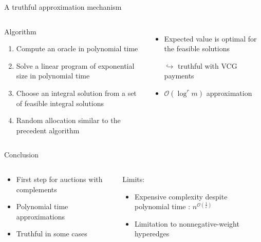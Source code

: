 \documentclass[aspectratio=169]{beamer}
\begin{document}
\begin{frame}{A truthful approximation mechanism}
    \begin{columns}
        \begin{block}{Algorithm}
            \begin{enumerate}
                \item Compute an oracle in polynomial time
                \item Solve a linear program of exponential size in polynomial time
                \item Choose an integral solution from a set of feasible integral solutions
                \item Random allocation similar to the precedent algorithm
            \end{enumerate}
        \end{block}

        \begin{itemize}
            \item Expected value is optimal for the feasible solutions

                  \(\hookrightarrow\) \alert{truthful} with VCG payments
            \item \(\mathcal{O}(\log^r m)\) approximation
        \end{itemize}

    \end{columns}
\end{frame}

\begin{frame}{Conclusion}
    \begin{columns}
        \begin{column}{0.5\textwidth}
            \begin{itemize}
                \item First step for auctions with complements
                \item Polynomial time approximations
                \item Truthful in some cases
            \end{itemize}
        \end{column}
        \begin{column}{0.5\textwidth}
            Limits:
            \begin{itemize}
                \item Expensive complexity despite polynomial time : \(n^{\mathcal{O}\left(\frac{1}{\varepsilon}\right)}\)
                \item Limitation to nonnegative-weight hyperedges
            \end{itemize}
        \end{column}
    \end{columns}
\end{frame}
\end{document}
